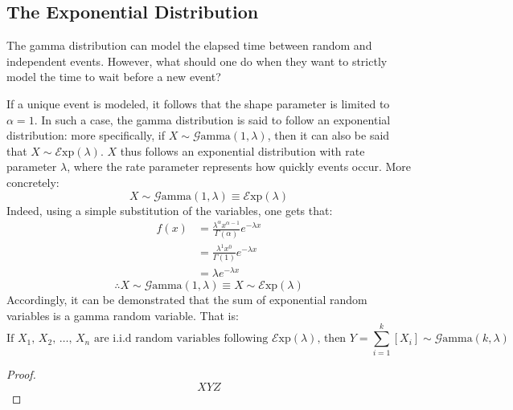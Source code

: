 \documentclass[12pt]{article}
\newcommand{\G}{\mathcal{G}}
\newcommand{\E}{\mathcal{E}}
\begin{document}
\pagebreak
\subsection{The Exponential Distribution}
The gamma distribution can model the elapsed time between random and independent events. However, what should one do
when they want to strictly model the time to wait before a new event?

If a unique event is modeled, it follows that the shape parameter is limited to $\alpha = 1$. In such a case, the gamma
distribution is said to follow an exponential distribution: more specifically, if $X\sim\G\text{amma}(1, \lambda)$, then
it can also be said that $X\sim\E\text{xp}(\lambda)$. $X$ thus follows an exponential distribution with rate parameter
$\lambda$, where the rate parameter represents how quickly events occur. More concretely:
\begin{equation*}
	X\sim\G\text{amma}(1, \lambda)\equiv\E\text{xp}(\lambda)
\end{equation*}
Indeed, using a simple substitution of the variables, one gets that:
\begin{equation*}\label{eq:relation:exp}
	\begin{split}
		f(x)	&=	\frac{\lambda^\alpha x^{\alpha-1}}{\Gamma(\alpha)}e^{-\lambda x}\\
				&=	\frac{\lambda^1 x^{0}}{\Gamma(1)}e^{-\lambda x}\\
				&=	\lambda e^{-\lambda x}
	\end{split}
\end{equation*}
\begin{equation*}
	\therefore X\sim\G\text{amma}(1, \lambda)\equiv X\sim\E\text{xp}(\lambda)
\end{equation*}
Accordingly, it can be demonstrated that the sum of exponential random variables is a gamma random variable. That is:
\begin{equation*}
	\text{If } X_1,\,X_2,\,\ldots,\,X_n \text{ are i.i.d random variables following } \E\text{xp}(\lambda)\text{, then }Y=\sum^k_{i=1}\left[X_i\right]\sim\G\text{amma}(k, \lambda)
\end{equation*}
\begin{proof}
	\begin{equation*}
		XYZ
	\end{equation*}
\end{proof}
\end{document}
